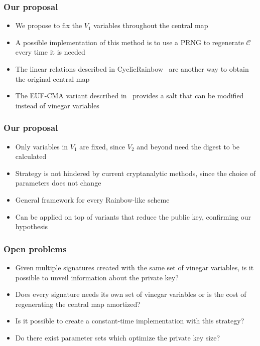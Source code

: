\documentclass[12pt]{beamer}
\begin{document}
\begin{frame}
  \frametitle{Our proposal}
  \begin{itemize}
    \item We propose to fix the $V_{1}$ variables throughout the central map
    \item A possible implementation of this method is to use a PRNG to
        regenerate $\mathcal{C}$ every time it is needed
    \item The linear relations described in
        CyclicRainbow~\cite{Petzoldt:inproc:2010:dec} are another way to obtain
        the original central map
    \item The EUF-CMA variant described in~\cite{Ding:misc:2017:dec} provides
        a salt that can be modified instead of vinegar variables
  \end{itemize}
\end{frame}

\begin{frame}
  \frametitle{Our proposal}
  \begin{itemize}
    \item Only variables in $V_{1}$ are fixed, since $V_{2}$ and beyond need
        the digest to be calculated
    \item Strategy is not hindered by current cryptanalytic methods, since the
        choice of parameters does not change
    \item General framework for every Rainbow-like scheme
    \item Can be applied on top of variants that reduce the public key,
        confirming our hypothesis
  \end{itemize}
\end{frame}

\begin{frame}
  \frametitle{Open problems}
  \begin{itemize}
    \item Given multiple signatures created with the same set of vinegar
        variables, is it possible to unveil information about the private key?
    \item Does every signature needs its own set of vinegar variables or is the
        cost of regenerating the central map amortized?
    \item Is it possible to create a constant-time implementation with this
        strategy?
    \item Do there exist parameter sets which optimize the private key size?
  \end{itemize}
\end{frame}
\end{document}
